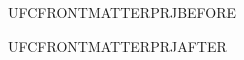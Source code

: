 \documentclass{abntexto-ufc}
\begin{document}
UFCFRONTMATTERPRJBEFORE\par
\ufcPrintCover
UFCFRONTMATTERPRJAFTER\par
\end{document}
